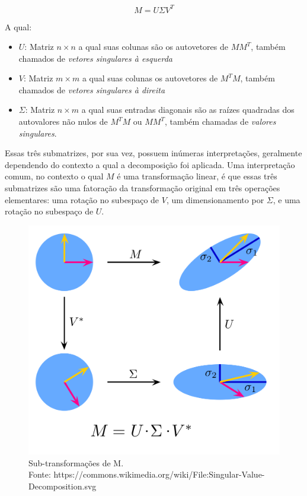 \documentclass[12pt]{article}
\begin{document}
\begin{equation} \label{eq:32}
    M = U \Sigma V^T
\end{equation}

A qual:
\begin{itemize}
  \item $U$: Matriz $n \times n$ a qual suas colunas são os autovetores de $MM^T$, também chamados de \emph{vetores singulares à esquerda}
  \item $V$: Matriz  $m \times m$ a qual suas colunas os autovetores de $M^TM$, também chamados de \emph{vetores singulares à direita}
  \item $\Sigma$: Matriz $n \times m$ a qual suas entradas diagonais são as raízes quadradas dos autovalores não nulos de $M^TM$ ou $MM^T$, também chamadas de \emph{valores singulares}. 
\end{itemize}

Essas três submatrizes, por sua vez, possuem inúmeras interpretações, geralmente dependendo do contexto a qual a decomposição foi aplicada. Uma interpretação comum, no contexto o qual $M$ é 
uma transformação linear, é que essas três submatrizes são uma fatoração da transformação original em três operações elementares: uma rotação no subespaço de $V$, um dimensionamento por $\Sigma$, 
e uma rotação no subespaço de $U$. 

\begin{figure}[H]
    \includegraphics[scale=0.20]{images/1024px-Singular-Value-Decomposition.svg.png}
    \centering 
    \caption{Sub-transformações de M.\\
        Fonte: https://commons.wikimedia.org/wiki/File:Singular-Value-Decomposition.svg}
    \label{subtransforms}
\end{figure}
\end{document}
